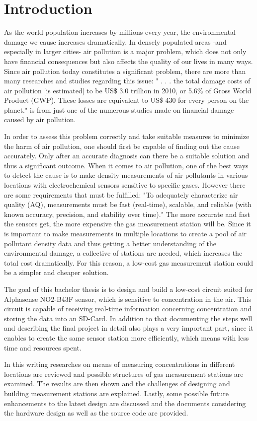 \chapter{Introduction}
\label{sec:introduction}


As the world population increases by millions every year, the environmental damage we cause increases dramatically. In densely populated areas -and especially in larger cities- air pollution is a major problem, which does not only have financial consequences but also affects the quality of our lives in many ways. Since air pollution today constitutes a significant problem, there are more than many researches and studies regarding this issue: " . . . the total damage costs of air pollution [is estimated] to be US\$ 3.0 trillion in 2010, or 5.6\% of Gross World Product (GWP). These losses are equivalent to US\$ 430 for every person on the planet."\cite{Hutton2011} is from just one of the numerous studies made on financial damage caused by air pollution.\par
In order to assess this problem correctly and take suitable measures to minimize the harm of air pollution, one should first be capable of finding out the cause accurately. Only after an accurate diagnosis can there be a suitable solution and thus a significant outcome. When it comes to air pollution, one of the best ways to detect the cause is to make density measurements of air pollutants in various locations with electrochemical sensors sensitive to specific gases. However there are some requirements that must be fulfilled: "To adequately characterize air quality (AQ), measurements must be fast (real-time), scalable, and reliable (with known accuracy, precision, and stability over time)."\cite{Cross2017} The more accurate and fast the sensors get, the more expensive the gas measurement station will be. Since it is important to make measurements in multiple locations to create a pool of air pollutant density data and thus getting a better understanding of the environmental damage, a collective of stations are needed, which increases the total cost dramatically. For this reason, a low-cost gas measurement station could be a simpler and cheaper solution.\par
The goal of this bachelor thesis is to design and build a low-cost circuit suited for Alphasense NO2-B43F sensor, which is sensitive to  concentration in the air. This circuit is capable of receiving real-time information concerning  concentration and storing the data into an SD-Card. In addition to that documenting the steps well and describing the final project in detail also plays a very important part, since it enables to create the same sensor station more efficiently, which means with less time and resources spent. \par 
In this writing researches on means of measuring  concentrations in different locations are reviewed and possible structures of gas measurement stations are examined. The results are then shown and the challenges of designing and building  measurement stations are explained. Lastly, some possible future enhancements to the latest design are discussed and the documents considering the hardware design as well as the source code are provided. 
